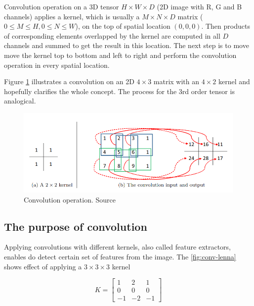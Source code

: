 Convolution operation on a 3D tensor $H \times W \times D$ (2D image with R, G and B channels) applies a kernel, which is usually a $M \times N \times D$ matrix 
($0 \leq M \leq H, 0 \leq N \leq W$), on the top of spatial location $(0, 0, 0)$. Then products of corresponding elements overlapped by the kernel are computed in all $D$ channels and summed to get the result in this location. The next step is to move move the kernel top to bottom and left to right and perform the convolution operation in every spatial location.

Figure \ref{fig:conv-example} illustrates a convolution on an 2D $4 \times 3$ matrix with an $4 \times 2$ kernel and hopefully clarifies the whole concept. The process for the 3rd order tensor is analogical.

\begin{figure}[h]
    \centering
    \includegraphics[width=14cm]{img/ConvExample.png}
    \caption{Convolution operation. Source \cite{Wu2017IntroductionTC}}
    \label{fig:conv-example}
\end{figure}

\subsection{The purpose of convolution}
\label{sub:purpose-of-convolution}

Applying convolutions with different kernels, also called feature extractors, enables do detect certain set of features from the image. The \ref{fig:conv-lenna} shows effect of applying a $3 \times 3 \times 3$ kernel

\begin{equation}
    K = \begin{bmatrix}
            1 & 2 & 1 \\
            0 & 0 & 0 \\
            -1 & -2 & -1
        \end{bmatrix}
\end{equation}

